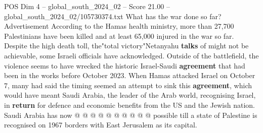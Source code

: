 \begin{textsample}{POS Dim 4 – global\_south\_2024\_02 – Score 21.00 – global\_south\_2024\_02/105730374.txt}
What has the war done so far?
Advertisement According to the Hamas health ministry, more than 27,700 Palestinians have been killed and at least 65,000 injured in the war so far.
Despite the high death toll, the"total victory"Netanyahu \textbf{talks} of might not be achievable, some Israeli officials have acknowledged.
Outside of the battlefield, the violence seems to have wrecked the historic Israel-Saudi \textbf{agreement} that had been in the works before October 2023.
When Hamas attacked Israel on October 7, many had said the timing seemed an attempt to sink this \textbf{agreement}, which would have meant Saudi Arabia, the leader of the Arab world, recognising Israel, in \textbf{return} for defence and economic benefits from the US and the Jewish nation.
Saudi Arabia has now @ @ @ @ @ @ @ @ @ @ possible till a state of Palestine is recognised on 1967 borders with East Jerusalem as its capital.

\end{textsample}
